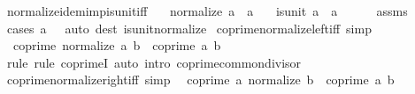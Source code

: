 \begin{isabellebody}
%
\endisatagproof
{\isafoldproof}%
%
\isadelimproof
\isanewline
%
\endisadelimproof
\isanewline
{}\isamarkupfalse%
\ normalize{\isacharunderscore}{\kern0pt}idem{\isacharunderscore}{\kern0pt}imp{\isacharunderscore}{\kern0pt}is{\isacharunderscore}{\kern0pt}unit{\isacharunderscore}{\kern0pt}iff{\isacharcolon}{\kern0pt}\isanewline
\ \ \ {\isachardoublequoteopen}normalize\ a\ {\isacharequal}{\kern0pt}\ a{\isachardoublequoteclose}\isanewline
\ \ \ {\isachardoublequoteopen}is{\isacharunderscore}{\kern0pt}unit\ a\ {\isasymlongleftrightarrow}\ a\ {\isacharequal}{\kern0pt}\ {}{\isachardoublequoteclose}\isanewline
%
\isadelimproof
\ \ %
\endisadelimproof
%
\isatagproof
{}\isamarkupfalse%
\ assms\ \isamarkupfalse%
\ {\isacharparenleft}{\kern0pt}cases\ {\isachardoublequoteopen}a\ {\isacharequal}{\kern0pt}\ {}{\isachardoublequoteclose}{\isacharparenright}{\kern0pt}\ {\isacharparenleft}{\kern0pt}auto\ dest{\isacharcolon}{\kern0pt}\ is{\isacharunderscore}{\kern0pt}unit{\isacharunderscore}{\kern0pt}normalize{\isacharparenright}{\kern0pt}%
\endisatagproof
{\isafoldproof}%
%
\isadelimproof
\isanewline
%
\endisadelimproof
\isanewline
{}\isamarkupfalse%
\ coprime{\isacharunderscore}{\kern0pt}normalize{\isacharunderscore}{\kern0pt}left{\isacharunderscore}{\kern0pt}iff\ {\isacharbrackleft}{\kern0pt}simp{\isacharbrackright}{\kern0pt}{\isacharcolon}{\kern0pt}\isanewline
\ \ {\isachardoublequoteopen}coprime\ {\isacharparenleft}{\kern0pt}normalize\ a{\isacharparenright}{\kern0pt}\ b\ {\isasymlongleftrightarrow}\ coprime\ a\ b{\isachardoublequoteclose}\isanewline
%
\isadelimproof
\ \ %
\endisadelimproof
%
\isatagproof
{}\isamarkupfalse%
\ {\isacharparenleft}{\kern0pt}rule{\isacharsemicolon}{\kern0pt}\ rule\ coprimeI{\isacharparenright}{\kern0pt}\ {\isacharparenleft}{\kern0pt}auto\ intro{\isacharcolon}{\kern0pt}\ coprime{\isacharunderscore}{\kern0pt}common{\isacharunderscore}{\kern0pt}divisor{\isacharparenright}{\kern0pt}%
\endisatagproof
{\isafoldproof}%
%
\isadelimproof
\isanewline
%
\endisadelimproof
\isanewline
{}\isamarkupfalse%
\ coprime{\isacharunderscore}{\kern0pt}normalize{\isacharunderscore}{\kern0pt}right{\isacharunderscore}{\kern0pt}iff\ {\isacharbrackleft}{\kern0pt}simp{\isacharbrackright}{\kern0pt}{\isacharcolon}{\kern0pt}\isanewline
\ \ {\isachardoublequoteopen}coprime\ a\ {\isacharparenleft}{\kern0pt}normalize\ b{\isacharparenright}{\kern0pt}\ {\isasymlongleftrightarrow}\ coprime\ a\ b{\isachardoublequoteclose}\isanewline

\end{isabellebody}
